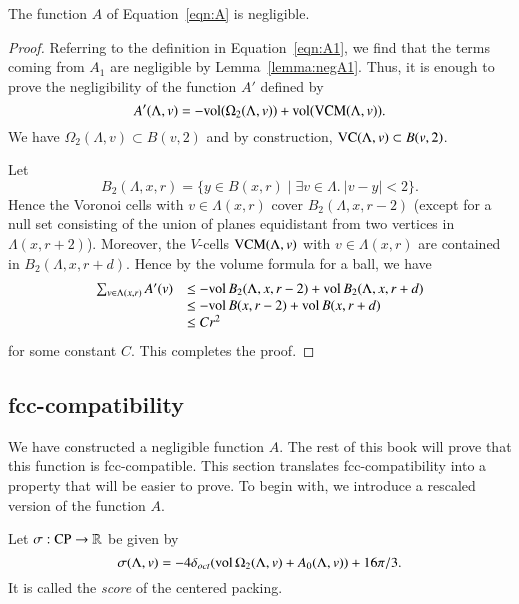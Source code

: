 \begin{theorem}\label{lemma:negligible}
The function $A$ of Equation~\ref{eqn:A} is negligible.
\end{theorem}

\begin{proof}   
Referring to the definition in Equation~\ref{eqn:A1}, we find that
the terms coming from $A_1$ are negligible by
Lemma~\ref{lemma:negA1}.  Thus, it is enough to prove the
negligibility of the function $A'$ defined by
      $$
      A'(\Lambda,v) = -{\operatorname{vol}}(\Omega_2(\Lambda,v))+
         {\operatorname{vol}}({\operatorname{VCM}}(\Lambda,v)).$$
We
have $\Omega_2(\Lambda,v)\subset B(v,2)$ and by
construction, 
${\operatorname{VC}}(\Lambda,v)\subset B(v,2)$. 

Let 
  $$
  B_2(\Lambda,x,r) = \{y \in B(x,r)\mid \exists v\in \Lambda.\ 
         |v-y| < 2\}.
  $$
Hence the Voronoi cells with
$v\in \Lambda(x,r)$ cover $B_2(\Lambda,x,r-2)$ (except for a null set
consisting of the union of planes equidistant from two vertices in
$\Lambda(x,r+2)$). Moreover, the $V$-cells ${\operatorname{VCM}}(\Lambda,v)$
with $v\in \Lambda(x,r)$ are contained in $B_2(\Lambda,x,r+d)$.  Hence by
the volume formula for a ball, we have
   $$
   \begin{array}{lll}
   \sum_{v\in\Lambda(x,r)} A'(v) &\le 
     -{\operatorname{vol}}\,B_2(\Lambda,x,r-2)
      +{\operatorname{vol}}\,B_2(\Lambda,x,r+d)\\&\le 
       -{\operatorname{vol}}\,B(x,r-2)
      +{\operatorname{vol}}\,B(x,r+d)\\& \le 
      C r^2
      \end{array}
   $$
for some constant $C$. This completes the proof.
\end{proof}


\subsection{fcc-compatibility}

We have constructed a negligible function $A$.  The rest of this
book will prove that this function is fcc-compatible.   This
section translates fcc-compatibility into a property that will be
easier to prove.  To begin with, we introduce a rescaled version
of the function $A$.

\begin{definition}[score,~$\sigma$]\label{def:score}
Let $\sigma:{\operatorname{CP}}\to\mathbb{R}$ be given by
   $$\sigma(\Lambda,v) = -4\delta_{oct} ({\operatorname{vol}}\,\Omega_2(\Lambda,v) + A_0(\Lambda,v)) +
   16\pi/3.$$
It is called the {\it score} of the centered packing.
%
\end{definition}

